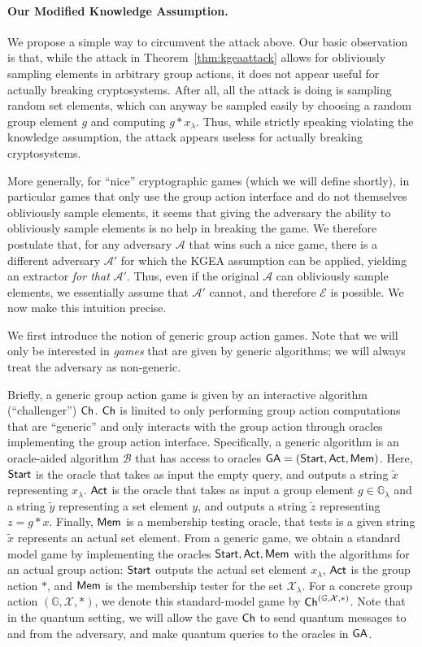 \documentclass{article}\usepackage[a4paper,margin=20mm]{geometry}
\numberwithin{theorem}{section}
\numberwithin{equation}{section}
\newcommand{\G}{\mathbb{G}}
\newcommand{\As}{{\mathcal{A}}}
\newcommand{\Bs}{{\mathcal{B}}}
\newcommand{\Es}{{\mathcal{E}}}
\newcommand{\Xs}{{\mathcal{X}}}
\begin{document}
\paragraph{Our Modified Knowledge Assumption.} We propose a simple way to circumvent the attack above. Our basic observation is that, while the attack in Theorem~\ref{thm:kgeaattack} allows for obliviously sampling elements in arbitrary group actions, it does not appear useful for actually breaking cryptosystems. After all, all the attack is doing is sampling random set elements, which can anyway be sampled easily by choosing a random group element $g$ and computing $g*x_\lambda$. Thus, while strictly speaking violating the knowledge assumption, the attack appears useless for actually breaking cryptosystems.

More generally, for ``nice'' cryptographic games (which we will define shortly), in particular games that only use the group action interface and do not themselves obliviously sample elements, it seems that giving the adversary the ability to obliviously sample elements is no help in breaking the game. We therefore postulate that, for any adversary $\As$ that wins such a nice game, there is a different adversary $\As'$ for which the KGEA assumption can be applied, yielding an extractor \emph{for that} $\As'$. Thus, even if the original $\As$ can obliviously sample elements, we essentially assume that $\As'$ cannot, and therefore $\Es$ is possible. We now make this intuition precise.

\medskip

We first introduce the notion of generic group action games. Note that we will only be interested in \emph{games} that are given by generic algorithms; we will always treat the adversary as non-generic.

Briefly, a generic group action game is given by an interactive algorithm (``challenger'') ${\sf Ch}$. ${\sf Ch}$ is limited to only performing group action computations that are ``generic'' and only interacts with the group action through oracles implementing the group action interface. Specifically, a generic algorithm is an oracle-aided algorithm $\Bs$ that has access to oracles ${\sf GA}=({\sf Start},{\sf Act},{\sf Mem})$. Here, ${\sf Start}$ is the oracle that takes as input the empty query, and outputs a string $\tilde{x}$ representing $x_\lambda$. ${\sf Act}$ is the oracle that takes as input a group element $g\in\G_\lambda$ and a string $\tilde{y}$ representing a set element $y$, and outputs a string $\tilde{z}$ representing $z=g*x$. Finally, ${\sf Mem}$ is a membership testing oracle, that tests is a given string $\tilde{x}$ represents an actual set element. From a generic game, we obtain a standard model game by implementing the oracles ${\sf Start},{\sf Act},{\sf Mem}$ with the algorithms for an actual group action: ${\sf Start}$ outputs the actual set element $x_\lambda$, ${\sf Act}$ is the group action $*$, and ${\sf Mem}$ is the membership tester for the set $\Xs_\lambda$. For a concrete group action $(\G,\Xs,*)$, we denote this standard-model game by ${\sf Ch}^{(\G,\Xs,*)}$. Note that in the quantum setting, we will allow the gave ${\sf Ch}$ to send quantum messages to and from the adversary, and make quantum queries to the oracles in ${\sf GA}$.
\end{document}
